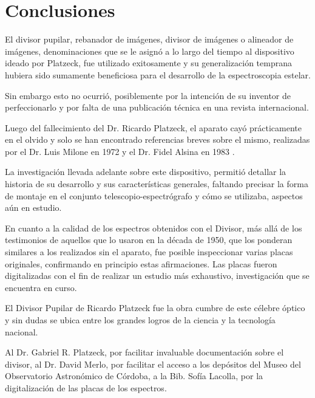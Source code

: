 \documentclass[baaa]{baaa}
\begin{document}
\section{Conclusiones}

El divisor pupilar, rebanador de imágenes, divisor de imágenes o alineador de imágenes, denominaciones que se le asignó a lo largo del tiempo al dispositivo ideado por Platzeck, fue utilizado exitosamente y su generalización temprana hubiera sido sumamente beneficiosa para el desarrollo de la espectroscopia estelar. 

Sin embargo esto no ocurrió, posiblemente por la intención de su inventor de perfeccionarlo y por falta de una publicación técnica en una revista internacional. 

Luego del fallecimiento del Dr. Ricardo Platzeck, el aparato cayó prácticamente en el olvido y solo se han encontrado referencias breves sobre el mismo, realizadas por el Dr. Luis Milone en 1972 \citep{Milone} y el Dr. Fidel Alsina en 1983 \citep{1983Alsina}.

La investigación llevada adelante sobre este dispositivo, permitió detallar la historia de su desarrollo y sus características generales, faltando precisar la forma de montaje en el conjunto telescopio-espectrógrafo y cómo se utilizaba, aspectos aún en estudio.

En cuanto a la calidad de los espectros obtenidos con el Divisor, más allá de los testimonios de aquellos que lo usaron en la década de 1950, que los ponderan similares a los realizados sin el aparato, fue posible inspeccionar varias placas originales, confirmando en principio estas afirmaciones. Las placas fueron digitalizadas con el fin de realizar un estudio más exhaustivo, investigación que se encuentra en curso.

El Divisor Pupilar de Ricardo Platzeck fue la obra cumbre de este célebre óptico y sin dudas se ubica entre los grandes logros de la ciencia y la tecnología nacional.


\begin{acknowledgement}
Al Dr. Gabriel R. Platzeck, por facilitar invaluable documentación sobre el divisor, al Dr. David Merlo, por facilitar el acceso a los depósitos del Museo del Observatorio Astronómico de Córdoba, a la Bib. Sofía Lacolla, por la digitalización de las placas de los espectros.
\end{acknowledgement}
\end{document}
